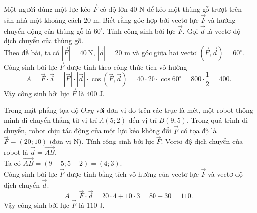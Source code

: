 \begin{ex}%
	Một người dùng một lực kéo $\overrightarrow{F}$ có độ lớn $40$ N để kéo một thùng gỗ trượt trên sàn nhà một khoảng cách $20$ m. Biết rằng góc hợp bởi vectơ lực $\overrightarrow{F}$ và hướng chuyển động của thùng gỗ là $60^{\circ}$. Tính công sinh bởi lực $\overrightarrow{F}$.
	\loigiai
	{Gọi $\overrightarrow{d}$ là vectơ độ dịch chuyển của thùng gỗ.\\
	Theo đề bài, ta có $\left|\overrightarrow{F}\right| = 40\,\mathrm{N}$, $\left|\overrightarrow{d}\right| = 20$ m và góc giữa hai vectơ $\left( \overrightarrow{F}, \overrightarrow{d} \right) = 60^{\circ}$.\\
	Công sinh bởi lực $\overrightarrow{F}$ được tính theo công thức tích vô hướng
	$$A = \overrightarrow{F} \cdot \overrightarrow{d} = \left|\overrightarrow{F}\right| \cdot \left|\overrightarrow{d}\right| \cdot \cos \left( \overrightarrow{F}, \overrightarrow{d} \right)= 40 \cdot 20 \cdot \cos 60^{\circ} = 800 \cdot \dfrac{1}{2} = 400.$$
	Vậy công sinh bởi lực $\overrightarrow{F}$ là $400$ J.}
\end{ex}
\begin{ex}%
	Trong mặt phẳng tọa độ $Oxy$ với đơn vị đo trên các trục là mét, một robot thông minh di chuyển thẳng từ vị trí $A(5; 2)$ đến vị trí $B(9; 5)$. Trong quá trình di chuyển, robot chịu tác động của một lực kéo không đổi $\overrightarrow{F}$ có tọa độ là $\overrightarrow{F} = (20; 10)$ (đơn vị N). Tính công sinh bởi lực $\overrightarrow{F}$.
	\loigiai
	{Vectơ độ dịch chuyển của robot là $\overrightarrow{d} = \overrightarrow{AB}$.\\
	Ta có $\overrightarrow{AB} = (9 - 5; 5 - 2) = (4; 3)$.\\
	Công sinh bởi lực $\overrightarrow{F}$ được tính bằng tích vô hướng của vectơ lực $\overrightarrow{F}$ và vectơ độ dịch chuyển $\overrightarrow{d}$.
	$$A = \overrightarrow{F} \cdot \overrightarrow{d} = 20 \cdot 4 + 10 \cdot 3 = 80 + 30 = 110.$$
	Vậy công sinh bởi lực $\overrightarrow{F}$ là $110$ J.}
\end{ex}
